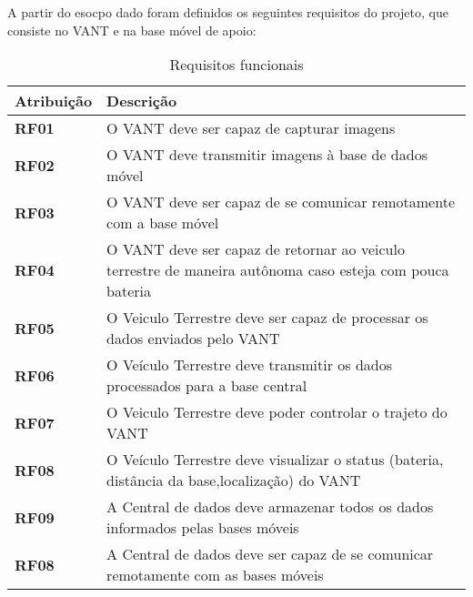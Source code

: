 A partir do esocpo dado foram definidos os seguintes requisitos do projeto, que consiste no VANT e na base móvel de apoio:

\begin{table}[H]
\centering
\begin{tabular}{ | p{3cm} | p{9cm}| }
\hline
\textbf{Atribuição} & \textbf{Descrição} \\ \hline
\textbf{RF01} & O VANT deve ser capaz de capturar imagens \\ \hline
\textbf{RF02} & O VANT deve transmitir imagens à base de dados móvel \\ \hline
\textbf{RF03} & O VANT deve ser capaz de se comunicar remotamente com a base móvel \\ \hline
\textbf{RF04} & O VANT deve ser capaz de retornar ao veiculo terrestre de maneira autônoma caso esteja com pouca bateria \\ \hline
\textbf{RF05} & O Veiculo Terrestre deve ser capaz de processar os dados enviados pelo VANT \\ \hline
\textbf{RF06} & O Veículo Terrestre deve transmitir os dados processados para a base central \\ \hline
\textbf{RF07} & O Veiculo Terrestre deve poder controlar o trajeto do VANT\\ \hline
\textbf{RF08} & O Veículo Terrestre deve visualizar o status (bateria, distância da base,localização) do VANT \\ \hline
\textbf{RF09} & A Central de dados deve armazenar todos os dados informados pelas bases móveis \\ \hline
\textbf{RF08} & A Central de dados deve ser capaz de se comunicar remotamente com as bases móveis \\ \hline
\end{tabular}
\caption{Requisitos funcionais}
\end{table}

